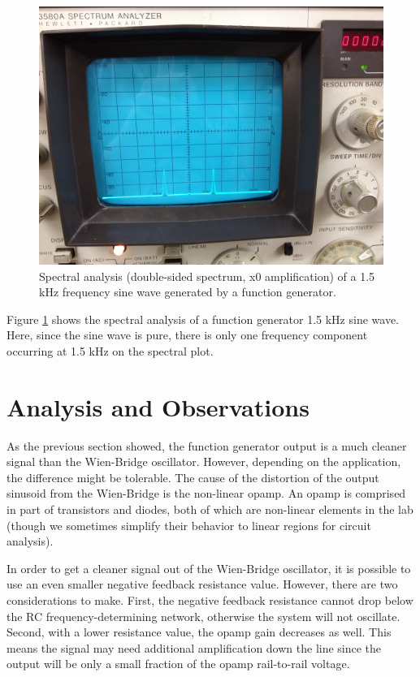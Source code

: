 \documentclass[12pt,letterpaper]{report}
\newlength \figwidth
\begin{document}
\begin{figure}[H]
\centering
\includegraphics[width=\figwidth, keepaspectratio=true]{lab9_images/gen_spec.jpg}
\caption{Spectral analysis (double-sided spectrum, x0 amplification) of a 1.5 kHz frequency sine wave generated by a function generator.}
\label{fig:gen_spec}
\end{figure}

Figure \ref{fig:gen_spec} shows the spectral analysis of a function generator 1.5 kHz sine wave. Here, since the sine wave is pure, there is only one frequency component occurring at 1.5 kHz on the spectral plot. 

\section*{Analysis and Observations}

As the previous section showed, the function generator output is a much cleaner signal than the Wien-Bridge oscillator. However, depending on the application, the difference might be tolerable. 
The cause of the distortion of the output sinusoid from the Wien-Bridge is the non-linear opamp. An opamp is comprised in part of transistors and diodes, both of which are non-linear elements in the lab (though we sometimes simplify their behavior to linear regions for circuit analysis).

In order to get a cleaner signal out of the Wien-Bridge oscillator, it is possible to use an even smaller negative feedback resistance value. However, there are two considerations to make. First, the negative feedback resistance cannot drop below the RC frequency-determining network, otherwise the system will not oscillate. Second, with a lower resistance value, the opamp gain decreases as well. This means the signal may need additional amplification down the line since the output will be only a small fraction of the opamp rail-to-rail voltage.
\end{document}
